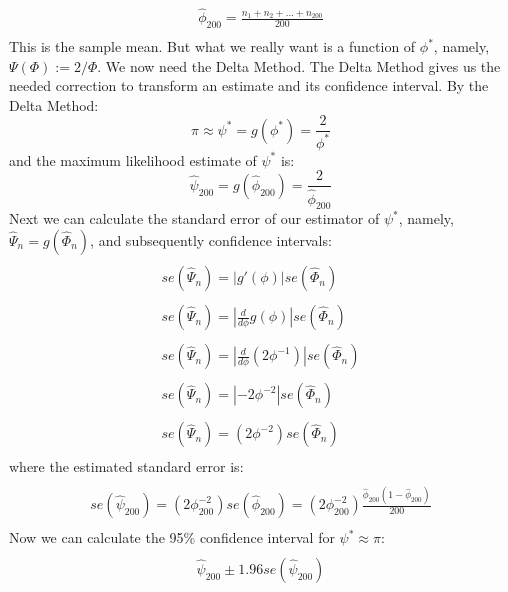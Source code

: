 \begin{displaymath}
\begin{array}{l}
\\\hat{\phi}_{200}=\frac{n_1+n_2+...+n_{200}}{200}\\
\end{array}
\end{displaymath}
This is the sample mean. But what we really want is a function of $\phi^*$, namely, $\Psi(\Phi):=2/\Phi$. We now need the Delta Method.  The Delta Method gives us the needed correction to transform an estimate and its  confidence interval.  By the Delta Method:
\[
\pi\approx\psi^*=g(\phi^*)=\frac{2}{\phi^*}
\]
and the maximum likelihood estimate of $\psi^*$ is:
\[
\hat{\psi}_{200}=g(\hat{\phi}_{200})=\frac{2}{\hat{\phi}_{200}}
\]
\noindent
Next we can calculate the standard error of our estimator of $\psi^*$, namely, $\hat{\Psi}_n=g(\hat{\Phi}_n)$, and subsequently confidence intervals:
\begin{displaymath}
\begin{array}{l}
\\se(\hat{\Psi}_n)=|g'( \phi)| se(\hat{\Phi}_n)\\
\\se(\hat{\Psi}_n)=|\frac{d}{d \phi}g( \phi)| se(\hat{\Phi}_n)\\
\\se(\hat{\Psi}_n)=|\frac{d}{d \phi}(2 \phi^{-1})| se(\hat{\Phi}_n)\\
\\se(\hat{\Psi}_n)=|-2 \phi^{-2}| se(\hat{\Phi}_n)\\
\\se(\hat{\Psi}_n)=(2 \phi^{-2}) se(\hat{\Phi}_n)\\
\end{array}
\end{displaymath}
where the estimated standard error is:
\begin{displaymath}
\begin{array}{l}
\\se(\hat{\psi}_{200})=(2 \phi_{200}^{-2}) se(\hat{\phi}_{200})=(2 \phi_{200}^{-2}) \frac{\hat{\phi}_{200} (1-\hat{\phi}_{200})}{200}\\
\end{array}
\end{displaymath}
Now we can calculate the 95\% confidence interval for $\psi^*\approx\pi$:
\begin{displaymath}
\begin{array}{l}
\\\hat{\psi}_{200}\pm1.96 se(\hat{\psi}_{200})\\
\end{array}
\end{displaymath}

